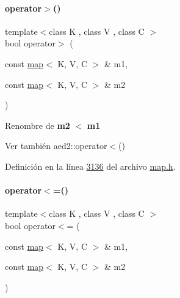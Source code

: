 \mbox{\label{classaed2_1_1map_a2000cd874b72034ce7fe730c811b6c63_a2000cd874b72034ce7fe730c811b6c63}} 
\paragraph{\texorpdfstring{operator$>$()}{operator>()}}
{\footnotesize\ttfamily template$<$class K , class V , class C $>$ \\
bool operator$>$ (\begin{DoxyParamCaption}\item[{const \hyperlink{classaed2_1_1map}{map}$<$ K, V, C $>$ \&}]{m1,  }\item[{const \hyperlink{classaed2_1_1map}{map}$<$ K, V, C $>$ \&}]{m2 }\end{DoxyParamCaption})\hspace{0.3cm}{\ttfamily [related]}}



Renombre de {\bfseries m2} $<$ {\bfseries m1} 

\begin{DoxySeeAlso}{Ver también}
aed2\+::operator$<$() 
\end{DoxySeeAlso}


Definición en la línea \hyperlink{map_8h_source_l03136}{3136} del archivo \hyperlink{map_8h_source}{map.\+h}.

\mbox{\label{classaed2_1_1map_afe374b37f17263d0cad3ee19a590d208_afe374b37f17263d0cad3ee19a590d208}} 
\paragraph{\texorpdfstring{operator$<$=()}{operator<=()}}
{\footnotesize\ttfamily template$<$class K , class V , class C $>$ \\
bool operator$<$= (\begin{DoxyParamCaption}\item[{const \hyperlink{classaed2_1_1map}{map}$<$ K, V, C $>$ \&}]{m1,  }\item[{const \hyperlink{classaed2_1_1map}{map}$<$ K, V, C $>$ \&}]{m2 }\end{DoxyParamCaption})\hspace{0.3cm}{\ttfamily [related]}}



